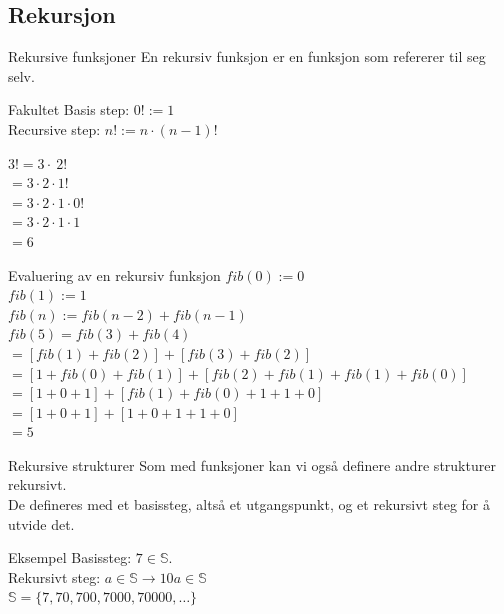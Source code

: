 \subsection{Rekursjon}
\begin{frame}{Rekursive funksjoner}
    En rekursiv funksjon er en funksjon som refererer til seg selv.
    \pause
    \begin{block}{Fakultet}
        Basis step: $0! := 1$ \\
        Recursive step: $n! := n \cdot (n-1)!$
    \end{block}    
    \pause 
    $3! = 3 \cdot ~ 2!$\\
    $= 3 \cdot 2 \cdot 1!$\\
    $= 3 \cdot 2 \cdot 1 \cdot 0!$\\
    $= 3 \cdot 2 \cdot 1 \cdot 1$\\
    $= 6$
\end{frame}

\begin{frame}{Evaluering av en rekursiv funksjon}
    $fib(0) := 0$\\
    $fib(1) := 1$\\
    $fib(n) := fib(n-2) + fib(n-1)$\\
    
    \pause
    $fib(5) = fib(3) + fib(4)$\\
    $ = [fib(1) + fib(2)] + [fib(3) + fib(2)]$\\
    $ = [1 + fib(0) + fib(1)] + [fib(2) + fib(1) + fib(1) + fib(0)]$\\
    $ = [1 + 0 + 1] + [fib(1) + fib(0) + 1 + 1 + 0]$\\
    $ = [1 + 0 + 1] + [1 + 0 + 1 + 1 + 0]$\\
    $ = 5$
\end{frame}

\begin{frame}{Rekursive strukturer}
    Som med funksjoner kan vi også definere andre strukturer rekursivt.\\
    
    De defineres med et basissteg, altså et utgangspunkt, og et rekursivt steg for å utvide det.\\
    
    \pause
    \begin{block}{Eksempel}
        Basissteg: $7 \in \mathbb{S}$.\\
        Rekursivt steg: $a \in \mathbb{S} \rightarrow 10a \in \mathbb{S}$\\
        $\mathbb{S} = \{7, 70, 700, 7000, 70000, \ldots\}$
    \end{block}
\end{frame}

